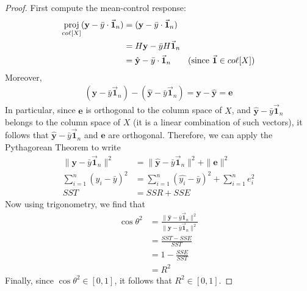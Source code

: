 \documentclass[12pt]{article}
\begin{document}
\begin{enumerate}
\begin{proof}
	First compute the mean-control response:
	\begin{align*}
		\underset{co\ell [X]}{\text{proj}}(\mathbf{y}-\bar{y}\cdot \vec{\mathbf{1}}_n)
		&=(\mathbf{y}-\bar{y}\cdot \vec{\mathbf{1}}_n)\\
		&=H\mathbf{y}-\bar{y} H\vec{\mathbf{1}}_n\\
		&=\hat{\mathbf{y}} - \bar{y} \cdot \vec{\mathbf{1}}_n
		\tag{since $\vec{\mathbf{1}}\in co\ell[X]$}
	\end{align*}
	Moreover,
	\begin{align*}
		(\mathbf{y}-\bar{y}\vec{\mathbf{1}}_n)-(\hat{\mathbf{y}}-\bar{y}\vec{\mathbf{1}}_n)
		=\mathbf{y}-\hat{\mathbf{y}}
		=\mathbf{e}
	\end{align*}
	In particular, since $\mathbf{e}$ is orthogonal to the column space of $X$,
	and $\hat{\mathbf{y}}-\bar{y}\vec{\mathbf{1}}_n$ belongs to the column space of $X$
	(it is a linear combination of such vectors), it follows that
	$\hat{\mathbf{y}}-\bar{y}\vec{\mathbf{1}}_n$ and $\mathbf{e}$ are orthogonal.
	Therefore, we can apply the Pythagorean Theorem to write
	\begin{align*}
		\|\mathbf{y}-\bar{y}\vec{\mathbf{1}}_n\|^2
		&=\|\hat{\mathbf{y}}-\bar{y}\vec{\mathbf{1}}_n\|^2 + \|\mathbf{e}\|^2\\
		\sum_{i=1}^{n}(y_i-\bar{y})^2 &=
		\sum_{i=1}^{n}(\hat{y_i}-\bar{y})^2+\sum_{i=1}^{n}e_i^2\\
		SST &= SSR + SSE
	\end{align*}
	Now using trigonometry, we find that
	\begin{align*}
		\cos\theta^2 &= \frac{\|\hat{\mathbf{y}}-\bar{y}\vec{\mathbf{1}}_n\|^2}{\|\mathbf{y}-\bar{y}\vec{\mathbf{1}}_n\|^2}\\
		&=\frac{SST-SSE}{SST}\\
		&=1-\frac{SSE}{SST}\\
		&=R^2
	\end{align*}
	Finally, since $\cos\theta^2\in[0, 1]$, it follows that $R^2\in[0, 1]$.
\end{proof}

\end{enumerate}
\end{document}
